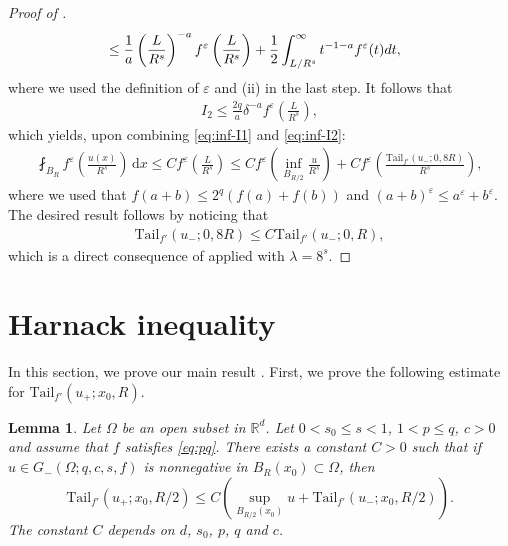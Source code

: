 \documentclass[11pt]{amsart}
\theoremstyle{plain}
\newtheorem{lemma}[theorem]{Lemma}
\theoremstyle{definition}
\numberwithin{equation}{section}
\renewcommand{\d}{\textnormal{d}}
\newcommand{\dx} {\,\mathrm{d}x}
\newcommand{\Rd}{\mathbb{R}^d}
\newcommand{\eps}{\varepsilon}
\begin{document}
\begin{proof}[Proof of ]
\begin{align*}
&\le \frac{1}{a} \left(\frac{L}{R^s}\right)^{-a} f^{\eps} \left( \frac{L}{R^s} \right) + \frac{1}{2} \int_{L/R^s}^{\infty} t^{-1-a} f^{\eps}(t) \d t,
\end{align*}
where we used the definition of $\eps$ and (ii) in the last step.
It follows that
\begin{align}
\label{eq:inf-I2}
I_2 \le \frac{2q}{a} \delta^{-a} f^{\eps} \left( \frac{L}{R^s} \right),
\end{align}
which yields, upon combining \eqref{eq:inf-I1} and \eqref{eq:inf-I2}:
\begin{align*}
\fint_{B_R} f^{\eps}\left( \frac{u(x)}{R^s} \right) \dx \le C f^{\eps} \left( \frac{L}{R^s} \right) \le C f^{\eps} \left( \inf_{B_{R/2}} \frac{u}{R^s} \right) + C f^{\eps} \left( \frac{\mathrm{Tail}_{f'}(u_-; 0, 8R)}{R^s} \right),
\end{align*}
where we used that $f(a+b) \le 2^q(f(a) + f(b))$ and $(a+b)^{\eps} \le a^{\eps} + b^{\eps}$. The desired result follows by noticing that 
\begin{align*}
\mathrm{Tail}_{f'}(u_-; 0, 8R) \le C \mathrm{Tail}_{f'}(u_-; 0, R),
\end{align*}
which is a direct consequence of  applied with $\lambda = 8^s$.
\end{proof}



\section{Harnack inequality} \label{sec:harnack}

In this section, we prove our main result . First, we prove the following estimate for $\mathrm{Tail}_{f'}(u_+;x_0,R)$.

\begin{lemma} \label{lem:tail}
Let $\Omega$ be an open subset in $\Rd$. Let $0 < s_0 \leq s < 1$, $1 < p \leq q$, $c > 0$ and assume that $f$ satisfies \eqref{eq:pq}. There exists a constant $C > 0$ such that if $u \in G_-(\Omega; q, c, s, f)$ is nonnegative in $B_{R}(x_0) \subset \Omega$, then
\begin{equation*}
\mathrm{Tail}_{f'}(u_+; x_0, R/2) \le C \left(\sup_{B_{R/2}(x_0)} u + \mathrm{Tail}_{f'}(u_-; x_0, R/2)\right).
\end{equation*}
The constant $C$ depends on $d$, $s_0$, $p$, $q$ and $c$.
\end{lemma}
\end{document}
